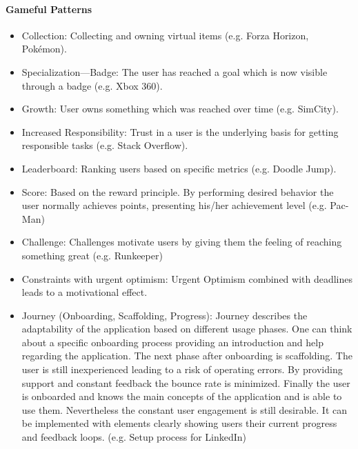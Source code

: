 \paragraph*{Gameful Patterns}
\label{GamefulPatterns}
\begin{itemize}
	\item Collection: Collecting and owning virtual items (e.g. Forza Horizon, Pokémon). \cite[p. 4, 35]{lewisIrresistibleAppsMotivational2014}
	\item Specialization—Badge: The user has reached a goal which is now visible through a badge (e.g. Xbox 360). \cite[p. 4, 37]{lewisIrresistibleAppsMotivational2014}
	\item Growth: User owns something which was reached over time (e.g. SimCity). \cite[p. 4, 40]{lewisIrresistibleAppsMotivational2014}
	\item Increased Responsibility: Trust in a user is the underlying basis for getting responsible tasks (e.g. Stack Overflow). \cite[p. 4, 41]{lewisIrresistibleAppsMotivational2014}
	\item Leaderboard: Ranking users based on specific metrics (e.g. Doodle Jump). \cite[p. 4, 44]{lewisIrresistibleAppsMotivational2014}
	\item Score: Based on the reward principle. By performing desired behavior the user normally achieves points, presenting his/her achievement level (e.g. Pac-Man) \cite[p. 4, 46]{lewisIrresistibleAppsMotivational2014}
	\item Challenge: Challenges motivate users by giving them the feeling of reaching something great (e.g. Runkeeper) \cite[p. 77, 78]{inproceedings}
	\item Constraints with urgent optimism: Urgent Optimism combined with deadlines leads to a motivational effect. \cite[p. 78]{inproceedings}
	\item Journey (Onboarding, Scaffolding, Progress): Journey describes the adaptability of the application based on different usage phases. One can think about a specific onboarding process providing an introduction and help regarding the application. The next phase after onboarding is scaffolding. The user is still inexperienced leading to a risk of operating errors. By providing support and constant feedback the bounce rate is minimized. Finally the user is onboarded and knows the main concepts of the application and is able to use them. Nevertheless the constant user engagement is still desirable. It can be implemented with elements clearly showing users their current progress and feedback loops. (e.g. Setup process for LinkedIn) \cite[p. 80, 81, 82]{inproceedings}
\end{itemize}

